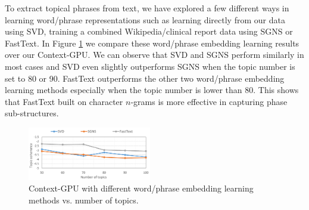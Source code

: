 \documentclass[letterpaper]{article}
\begin{document}
To extract topical phrases from text, we have explored a few different ways in learning word/phrase representations such as learning directly from our data using SVD, training a combined Wikipedia/clinical report data using SGNS or FastText. In Figure \ref{fig:embeddings} we compare these word/phrase embedding learning results over our Context-GPU. %
We can observe that SVD and SGNS perform similarly in most cases and SVD even slightly outperforms SGNS when the topic number is set to 80 or 90. FastText outperforms the other two word/phrase embedding learning methods especially when the topic number is lower than 80. This shows that FastText built on character $n$-grams is more effective in capturing phase sub-structures.

\begin{figure}[h!]
  \centering
\includegraphics[width=0.48\textwidth]{model_embedding_cropped.pdf}
\caption{Context-GPU with different word/phrase embedding learning methods vs. number of topics.}
\label{fig:embeddings}
\end{figure}
\end{document}

